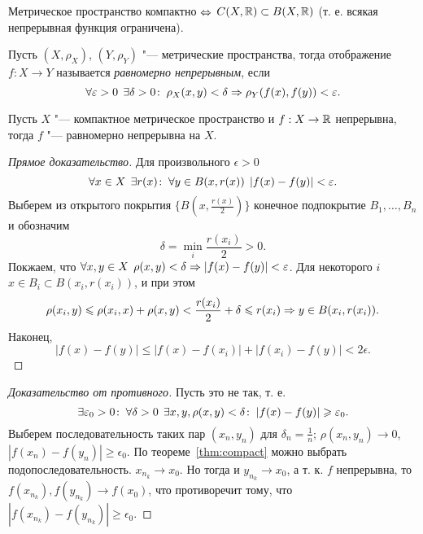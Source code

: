 \documentclass[main]{subfiles}
\begin{document}
\begin{exercise}
  Метрическое пространство компактно \( \Leftrightarrow \)
  \( C(X, \mathbb{R}) \subset B(X, \mathbb{R}) \)
  (т. е. всякая непрерывная функция ограничена).
\end{exercise}

\begin{definition}
  Пусть \( (X, \rho_X) \), \( (Y, \rho_Y) \) "---
  метрические пространства, тогда
  отображение \( f : X \to Y \) называется
  \emph{равномерно непрерывным}, если
  \[
    \forall {\varepsilon> 0} \; \,
    \exists \delta > 0 \colon \:
    \rho_X(x, y) < \delta \Rightarrow
    \rho_Y(f(x), f(y)) < \varepsilon.
  \]
\end{definition}

\begin{theorem*}[Кантора]
  Пусть \( X \) "--- компактное метрическое пространство
  и \( f : X \to \mathbb{R} \) непрерывна,
  тогда \( f \) "--- равномерно непрерывна на \( X \).
\end{theorem*}
\begin{proof}[Прямое доказательство]
  Для произвольного \( \epsilon > 0 \)
  \[
    \forall {x \in X} \; \, \exists r(x) \colon \:
    \forall {y \in B(x, r(x))} \; \,
    |f(x) - f(y)| < \varepsilon.
  \]
  Выберем из открытого покрытия
  \( \{ B(x, \frac{r(x)}{2}) \} \) конечное
  подпокрытие \( B_1, \dots, B_n \)
  и обозначим \[ \delta = \min_i \frac{r(x_i)}{2} > 0. \]
  Покжаем, что \( \forall {x, y \in X} \; \, \rho(x, y) < \delta
  \Rightarrow |f(x) - f(y)| < \varepsilon \).
  Для некоторого \( i \) \( x \in B_i \subset B(x_i, r(x_i)) \),
  и при этом
  \[
    \rho(x_i, y) \leqslant
    \rho(x_i, x) + \rho(x, y) <
    \frac{r(x_i)}{2} + \delta \leqslant
    r(x_i) \Rightarrow y \in B(x_i, r(x_i)).
  \]
  Наконец,
  \[
    |f(x) - f(y)| \le
    |f(x) - f(x_i)| + |f(x_i) - f(y)| <
    2 \epsilon.
  \]
\end{proof}
\begin{proof}[Доказательство от противного]
  Пусть это не так, т. е.
  \[
    \exists \varepsilon_0 > 0 \colon \:
    \forall {\delta > 0} \; \,
    \exists x, y, \rho(x, y) < \delta \colon \:
    |f(x) - f(y)| \geqslant \varepsilon_0.
  \]
  Выберем последовательность таких пар \( (x_n, y_n) \)
  для \( \delta_n = \frac{1}{n} \); \( \rho(x_n, y_n) \to 0 \),
  \( |f(x_n) - f(y_n)| \ge \epsilon_0 \).
  По теореме~\ref{thm:compact} можно выбрать подопоследовательность.
  \( x_{n_k} \to x_0 \). Но тогда и \( y_{n_k} \to x_0 \),
  а т. к. \( f \) непрерывна, то \( f(x_{n_k}), f(y_{n_k}) \to f(x_0) \),
  что противоречит тому, что
  \( |f(x_{n_k}) - f(y_{n_k})| \ge \epsilon_0 \).
\end{proof}
\end{document}
